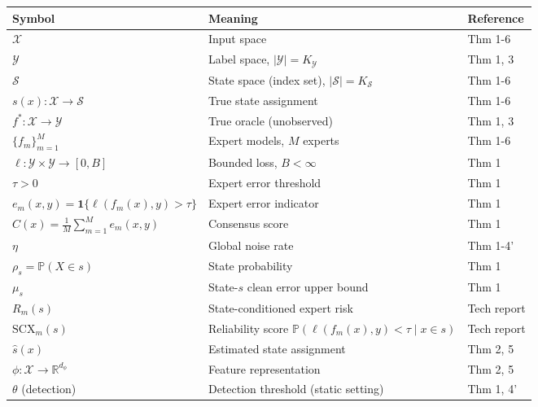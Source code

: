 \documentclass[
  12pt,
]{article}
\begin{document}
\begin{longtable}[]{@{}
  >{\raggedright\arraybackslash}p{}
  >{\raggedright\arraybackslash}p{}
  >{\raggedright\arraybackslash}p{}@{}}
\toprule\noalign{}
\begin{minipage}[b]{\linewidth}\raggedright
Symbol
\end{minipage} & \begin{minipage}[b]{\linewidth}\raggedright
Meaning
\end{minipage} & \begin{minipage}[b]{\linewidth}\raggedright
Reference
\end{minipage} \\
\midrule\noalign{}
\endhead
\bottomrule\noalign{}
\endlastfoot
\(\mathcal{X}\) & Input space & Thm 1-6 \\
\(\mathcal{Y}\) & Label space, \(|\mathcal{Y}| = K_{\mathcal{Y}}\) & Thm
1, 3 \\
\(\mathcal{S}\) & State space (index set),
\(|\mathcal{S}| = K_{\mathcal{S}}\) & Thm 1-6 \\
\(s(x): \mathcal{X} \to \mathcal{S}\) & True state assignment & Thm
1-6 \\
\(f^*: \mathcal{X} \to \mathcal{Y}\) & True oracle (unobserved) & Thm 1,
3 \\
\(\{f_m\}_{m=1}^M\) & Expert models, \(M\) experts & Thm 1-6 \\
\(\ell: \mathcal{Y} \times \mathcal{Y} \to [0,B]\) & Bounded loss,
\(B < \infty\) & Thm 1 \\
\(\tau > 0\) & Expert error threshold & Thm 1 \\
\(e_m(x,y) = \mathbf{1}\{\ell(f_m(x), y) > \tau\}\) & Expert error
indicator & Thm 1 \\
\(C(x) = \frac{1}{M}\sum_{m=1}^M e_m(x,y)\) & Consensus score & Thm 1 \\
\(\eta\) & Global noise rate & Thm 1-4' \\
\(\rho_s = \mathbb{P}(X \in s)\) & State probability & Thm 1 \\
\(\mu_s\) & State-\(s\) clean error upper bound & Thm 1 \\
\(R_m(s)\) & State-conditioned expert risk & Tech report \\
\(\text{SCX}_m(s)\) & Reliability score
\(\mathbb{P}(\ell(f_m(x), y) < \tau \mid x \in s)\) & Tech report \\
\(\hat{s}(x)\) & Estimated state assignment & Thm 2, 5 \\
\(\phi: \mathcal{X} \to \mathbb{R}^{d_\phi}\) & Feature representation &
Thm 2, 5 \\
\(\theta\) (detection) & Detection threshold (static setting) & Thm 1,
4' \\
\end{longtable}
\end{document}
